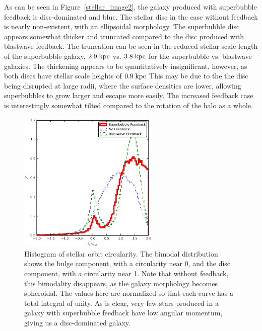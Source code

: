 As can be seen in Figure~\ref{stellar_image2}, the galaxy produced with
superbubble feedback is disc-dominated and blue.  The stellar disc in the case
without feedback is nearly non-existent, with an ellipsoidal morphology.  The
superbubble disc appears somewhat thicker and truncated compared to the disc
produced with blastwave feedback.  The truncation can be seen in the reduced
stellar scale length of the superbubble galaxy, $2.9\;\rm{kpc}$ vs.
$3.8\;\rm{kpc}$ for the superbubble vs. blastwave galaxies.  The thickening
appears to be quantitatively insignificant, however, as both discs have stellar
scale heights of $0.9\;\rm{kpc}$ This may be due to the the disc being disrupted
at large radii, where the surface densities are lower, allowing superbubbles to
grow larger and escape more easily.  The increased feedback case is
interestingly somewhat tilted compared to the rotation of the halo as a whole.  
\begin{figure}
    \includegraphics[width=0.6\textwidth]{figures2/circularity.eps}
    \caption[Stellar orbit circularity histogram]{Histogram
    of stellar orbit circularity.  The bimodal distribution shows the bulge
    component, with a circularity near 0, and the disc component, with a
    circularity near 1.  Note that without feedback, this bimodality disappears,
    as the galaxy morphology becomes spheroidal.  The values here are normalized
    so that each curve has a total integral of unity.  As is clear, very few
    stars produced in a galaxy with superbubble feedback have low angular
    momentum, giving us a disc-dominated galaxy.}
    \label{circularity2}
\end{figure}
